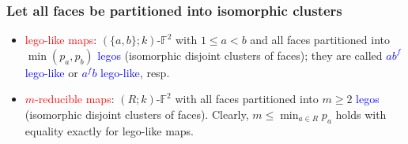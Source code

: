 \documentclass{beamer}
\begin{document}
\begin{frame}\frametitle{Let all faces be partitioned into isomorphic clusters}
\vspace{-2mm}

\begin{itemize}
\item   \textcolor{red}{lego-like maps}: $(\{a, b\}; k)$-$\mathbb{F}^2$ 
with $1$$\le$$ a$$<$$b$ and 
all  faces partitioned  into  $\min (p_a, p_b)$ \textcolor{blue}{legos} (isomorphic disjoint  clusters
 of faces);
 they are called \textcolor{blue}{$ab^f$ lego-like} or \textcolor{blue}{$a^fb$ lego-like}, resp. 
 





\item  \textcolor{red}{$m$-reducible maps}: $(R;k)$-$\mathbb{F}^2$ with all  faces partitioned  into  $m\ge 2$ \textcolor{blue}{legos} (isomorphic disjoint clusters of faces). Clearly,   $m\le \min_{a\in R}p_a$ holds with equality exactly for lego-like maps.

\end{itemize} 



\end{frame}
\end{document}
